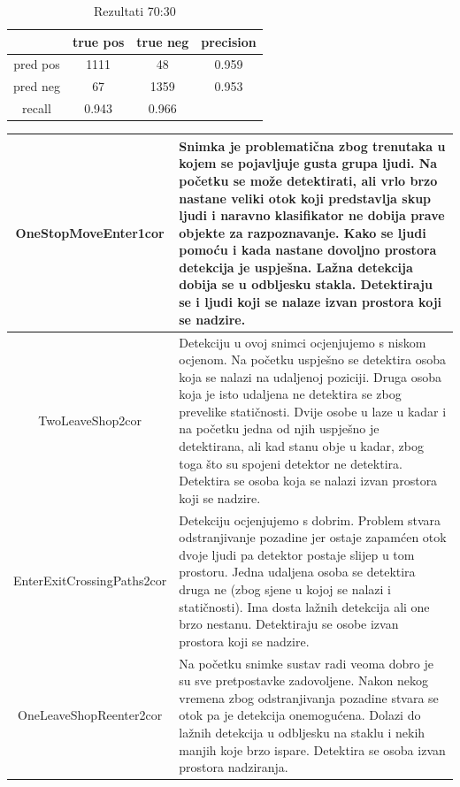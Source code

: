 \documentclass[times, utf8, seminar, numeric]{fer}
\begin{document}
\begin{table}
\begin{center}
\begin{tabular}{|c|c|c|c|}
\hline
 & true pos & true neg& precision\\ \hline
pred pos & 1111 & 48 &0.959\\ \hline
pred neg & 67 & 1359 &0.953\\ \hline
recall &0.943 & 0.966& \\ \hline
\end{tabular}
\end{center}
\caption{Rezultati 70:30}
\label{70}
\end{table}

\begin{table}
\begin{center}
\begin{tabular}{|c|p{10cm}|}
\hline
OneStopMoveEnter1cor & Snimka je problematična zbog trenutaka u kojem se pojavljuje gusta grupa ljudi. Na početku se može detektirati, ali vrlo brzo nastane veliki otok koji predstavlja skup ljudi i naravno klasifikator ne dobija prave objekte za razpoznavanje. Kako se ljudi pomoću i kada nastane dovoljno prostora detekcija je uspješna. Lažna detekcija dobija se u odbljesku stakla. Detektiraju se i ljudi koji se nalaze izvan prostora koji se nadzire. \\ \hline
TwoLeaveShop2cor & Detekciju u ovoj snimci ocjenjujemo s niskom ocjenom. Na početku uspješno se detektira osoba koja se nalazi na udaljenoj poziciji. Druga osoba koja je isto udaljena ne detektira se zbog prevelike statičnosti. Dvije osobe u laze u kadar i na početku jedna od njih uspješno je detektirana, ali kad stanu obje u kadar, zbog toga što su spojeni detektor ne detektira. Detektira se osoba koja se nalazi izvan prostora koji se nadzire. \\ \hline
EnterExitCrossingPaths2cor& Detekciju ocjenjujemo s dobrim. Problem stvara odstranjivanje pozadine jer ostaje zapamćen otok dvoje ljudi pa detektor postaje slijep u tom prostoru. Jedna udaljena osoba se detektira druga ne (zbog sjene u kojoj se nalazi i statičnosti). Ima dosta lažnih detekcija ali one brzo nestanu. Detektiraju se osobe izvan prostora koji se nadzire. \\ \hline
OneLeaveShopReenter2cor & Na početku snimke sustav radi veoma dobro je su sve pretpostavke zadovoljene. Nakon nekog vremena zbog odstranjivanja pozadine stvara se otok pa je detekcija onemogućena. Dolazi do lažnih detekcija u odbljesku na staklu i nekih manjih koje brzo ispare. Detektira se osoba izvan prostora nadziranja.\\ \hline

\end{tabular}
\end{center}
\end{table}
\end{document}
